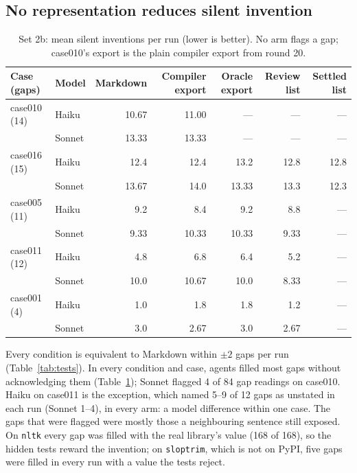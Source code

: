 \documentclass{article}
\newcommand{\code}[1]{\texttt{#1}}
\begin{document}
\subsection{No representation reduces silent invention}\label{sec:silent}

\begin{table}[t]
\caption{Set 2b: mean silent inventions per run (lower is better). No arm flags a gap; case010's export is the plain compiler export from round 20.}
\label{tab:silent}
\centering\small
\begin{tabular}{llrrrrr}
\toprule
Case (gaps) & Model & Markdown & Compiler export & Oracle export & Review list & Settled list \\
\midrule
case010 (14) & Haiku  & 10.67 & 11.00 & --- & --- & --- \\
             & Sonnet & 13.33 & 13.33 & --- & --- & --- \\
case016 (15) & Haiku  & 12.4 & 12.4 & 13.2 & 12.8 & 12.8 \\
             & Sonnet & 13.67 & 14.0 & 13.33 & 13.3 & 12.3 \\
case005 (11) & Haiku  & 9.2 & 8.4 & 9.2 & 8.8 & --- \\
             & Sonnet & 9.33 & 10.33 & 10.33 & 9.33 & --- \\
case011 (12) & Haiku  & 4.8 & 6.8 & 6.4 & 5.2 & --- \\
             & Sonnet & 10.0 & 10.67 & 10.0 & 8.33 & --- \\
case001 (4)  & Haiku  & 1.0 & 1.8 & 1.8 & 1.2 & --- \\
             & Sonnet & 3.0 & 2.67 & 3.0 & 2.67 & --- \\
\bottomrule
\end{tabular}
\end{table}

Every condition is equivalent to Markdown within $\pm 2$ gaps per run (Table~\ref{tab:tests}). In every condition and case, agents filled most gaps without acknowledging them (Table~\ref{tab:silent}); Sonnet flagged 4 of 84 gap
readings on case010. Haiku on case011 is the exception, which named 5--9 of 12 gaps as unstated in each run
(Sonnet 1--4), in every arm: a model difference within one case. The gaps that were flagged were mostly
those a neighbouring sentence still exposed. On \code{nltk} every gap was filled with the real library's
value (168 of 168), so the hidden tests reward the invention; on \code{sloptrim}, which is not on PyPI, five
gaps were filled in every run with a value the tests reject.
\end{document}
